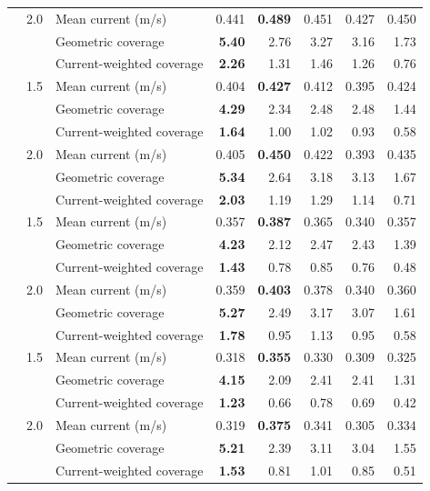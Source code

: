 \begin{table}[p]
\begin{tabular*}{\textwidth}{@{\extracolsep{\fill}}rrlrrrrr@{}}
\addlinespace[1pt]
20 & 2.0 & Mean current (m/s) & 0.441 & \textbf{0.489} & 0.451 & 0.427 & 0.450 \\
 &  & Geometric coverage & \textbf{5.40} & 2.76 & 3.27 & 3.16 & 1.73 \\
 &  & Current-weighted coverage & \textbf{2.26} & 1.31 & 1.46 & 1.26 & 0.76 \\
\addlinespace[1pt]
\midrule
30 & 1.5 & Mean current (m/s) & 0.404 & \textbf{0.427} & 0.412 & 0.395 & 0.424 \\
 &  & Geometric coverage & \textbf{4.29} & 2.34 & 2.48 & 2.48 & 1.44 \\
 &  & Current-weighted coverage & \textbf{1.64} & 1.00 & 1.02 & 0.93 & 0.58 \\
\addlinespace[1pt]
30 & 2.0 & Mean current (m/s) & 0.405 & \textbf{0.450} & 0.422 & 0.393 & 0.435 \\
 &  & Geometric coverage & \textbf{5.34} & 2.64 & 3.18 & 3.13 & 1.67 \\
 &  & Current-weighted coverage & \textbf{2.03} & 1.19 & 1.29 & 1.14 & 0.71 \\
\addlinespace[1pt]
\midrule
40 & 1.5 & Mean current (m/s) & 0.357 & \textbf{0.387} & 0.365 & 0.340 & 0.357 \\
 &  & Geometric coverage & \textbf{4.23} & 2.12 & 2.47 & 2.43 & 1.39 \\
 &  & Current-weighted coverage & \textbf{1.43} & 0.78 & 0.85 & 0.76 & 0.48 \\
\addlinespace[1pt]
40 & 2.0 & Mean current (m/s) & 0.359 & \textbf{0.403} & 0.378 & 0.340 & 0.360 \\
 &  & Geometric coverage & \textbf{5.27} & 2.49 & 3.17 & 3.07 & 1.61 \\
 &  & Current-weighted coverage & \textbf{1.78} & 0.95 & 1.13 & 0.95 & 0.58 \\
\addlinespace[1pt]
\midrule
50 & 1.5 & Mean current (m/s) & 0.318 & \textbf{0.355} & 0.330 & 0.309 & 0.325 \\
 &  & Geometric coverage & \textbf{4.15} & 2.09 & 2.41 & 2.41 & 1.31 \\
 &  & Current-weighted coverage & \textbf{1.23} & 0.66 & 0.78 & 0.69 & 0.42 \\
\addlinespace[1pt]
50 & 2.0 & Mean current (m/s) & 0.319 & \textbf{0.375} & 0.341 & 0.305 & 0.334 \\
 &  & Geometric coverage & \textbf{5.21} & 2.39 & 3.11 & 3.04 & 1.55 \\
 &  & Current-weighted coverage & \textbf{1.53} & 0.81 & 1.01 & 0.85 & 0.51 \\

\end{tabular*}
\end{table}
